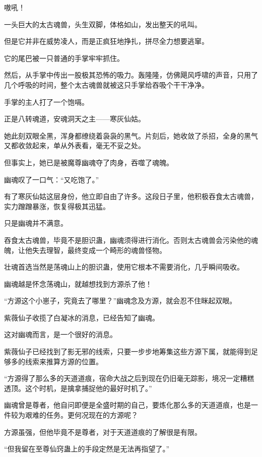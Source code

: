 
\begin{this_body}

嗷吼！

一头巨大的太古魂兽，头生双脚，体格如山，发出整天的吼叫。

但是它并非在威势凌人，而是正疯狂地挣扎，拼尽全力想要逃窜。

它的尾巴被一只普通的手掌牢牢抓住。

然后，从手掌中传出一股极其恐怖的吸力。轰隆隆，仿佛飓风呼啸的声音，只用了几个呼吸的时间，整个太古魂兽就被这只手掌给吞吸个干干净净。

手掌的主人打了一个饱嗝。

正是八转魂道，安魂洞天之主——寒灰仙姑。

她此刻双眼全黑，浑身都缭绕着袅袅的黑气。片刻后，她收敛了杀招，全身的黑气又都收敛起来，单从外表看，毫无不妥之处。

但事实上，她已是被魔尊幽魂夺了肉身，吞噬了魂魄。

幽魂叹了一口气：“又吃饱了。”

有了寒灰仙姑这层身份，他立即自由了许多。这段日子里，他积极吞食太古魂兽，实力蹭蹭暴涨，恢复得极其迅猛。

只是幽魂并不满意。

吞食太古魂兽，毕竟不是胆识蛊，幽魂须得进行消化。否则太古魂兽会污染他的魂魄，让他失去理智，最终变成一个畸形的魂兽怪物。

壮魂首选当然是荡魂山上的胆识蛊，使用它根本不需要消化，几乎瞬间吸收。

幽魂越是怀念荡魂山，就越想找到方源杀了他！

“方源这个小崽子，究竟去了哪里？”幽魂念及方源，就会忍不住眯起双眼。

紫薇仙子收揽了白凝冰的消息，已经告知了幽魂。

这对幽魂而言，是一个很好的消息。

紫薇仙子已经找到了影无邪的线索，只要一步步地筹集这些方源下属，就能得到足够多的线索来推算方源的位置。

“方源得了那么多的天道道痕，宿命大战之后到现在仍旧毫无踪影，境况一定糟糕透顶。这个时机，是擒拿捕捉他的最好时机了。”

幽魂曾是尊者，他自问即便是全盛时期的自己，要炼化那么多的天道道痕，也是一件较为艰难的任务。更何况现在的方源呢？

方源虽强，但他毕竟不是尊者，对于天道道痕的了解很是有限。

“但我留在至尊仙窍蛊上的手段定然是无法再指望了。”


\end{this_body}
